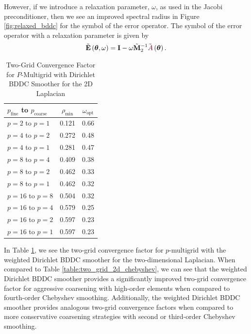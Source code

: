 However, if we introduce a relaxation parameter, $\omega$, as used in the Jacobi preconditioner, then we see an improved spectral radius in Figure \ref{fig:relaxed_bddc} for the symbol of the error operator.
The symbol of the error operator with a relaxation parameter is given by
\begin{equation}
\tilde{\mathbf{E}} \left( \boldsymbol{\theta}, \omega \right) = \mathbf{I} - \omega \tilde{\mathbf{M}}_2^{-1} \tilde{{\color{burgundy}A}} \left( \boldsymbol{\theta} \right).
\end{equation}

\begin{table}[ht!]
\begin{center}
\begin{tabular}{l cc}
  \toprule
  $p_{\text{fine}}$ to $p_{\text{coarse}}$  & $\rho_{\min}$ & $\omega_{\text{opt}}$  \\
  \toprule
  $p = 2$ to $p = 1$   &  0.121 & 0.66  \\
  \midrule
  $p = 4$ to $p = 2$   &  0.272 & 0.48  \\
  $p = 4$ to $p = 1$   &  0.281 & 0.47  \\
  \midrule
  $p = 8$ to $p = 4$   &  0.409 & 0.38  \\
  $p = 8$ to $p = 2$   &  0.462 & 0.33  \\
  $p = 8$ to $p = 1$   &  0.462 & 0.32  \\
  \midrule
  $p = 16$ to $p = 8$  &  0.504 & 0.32  \\
  $p = 16$ to $p = 4$  &  0.579 & 0.25  \\
  $p = 16$ to $p = 2$  &  0.597 & 0.23  \\
  $p = 16$ to $p = 1$  &  0.597 & 0.23  \\
  \bottomrule
\end{tabular}
\end{center}
\caption{Two-Grid Convergence Factor for $P$-Multigrid with Dirichlet BDDC Smoother for the 2D Laplacian}
\label{table:two_grid_bddc_smoother}
\end{table}

In Table \ref{table:two_grid_bddc_smoother}, we see the two-grid convergence factor for $p$-multigrid with the weighted Dirichlet BDDC smoother for the two-dimensional Laplacian.
When compared to Table \ref{table:two_grid_2d_chebyshev}, we can see that the weighted Dirichlet BDDC smoother provides a significantly improved two-grid convergence factor for aggressive coarsening with high-order elements when compared to fourth-order Chebyshev smoothing.
Additionally, the weighted Dirichlet BDDC smoother provides analogous two-grid convergence factors when compared to more conservative coarsening strategies with second or third-order Chebyshev smoothing.

